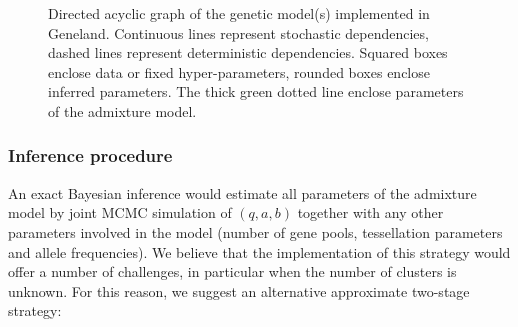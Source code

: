 \documentclass[a4paper,10pt]{article}
\begin{document}

\begin{figure}[h]
\centerline{}
\caption{Directed acyclic graph of the genetic model(s) implemented in {\sc Geneland}. 
Continuous lines represent stochastic dependencies, dashed lines represent 
deterministic dependencies. Squared boxes enclose data or fixed hyper-parameters, rounded boxes enclose inferred parameters. 
The thick green dotted line enclose parameters of the admixture model. }\label{fig:dag}
\end{figure}


\subsubsection{Inference  procedure}
An exact Bayesian inference would estimate all parameters of the admixture model 
by joint MCMC simulation of $(q,a,b)$ together with any other parameters involved in the model 
(number of gene pools, tessellation parameters and allele frequencies). 
We believe that the implementation of this strategy would offer a number of challenges, in particular when the number of clusters is unknown. 
For this reason, we suggest an alternative approximate two-stage strategy:
\end{document}
